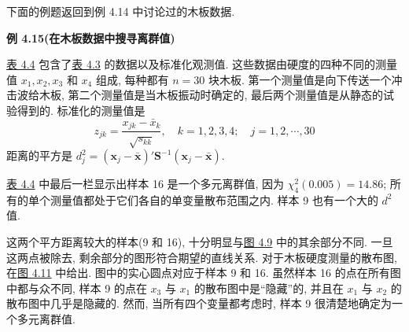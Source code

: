 下面的例题返回到例 4.14 中讨论过的木板数据.

\noindent\textbf{例 4.15}\quad \textbf{(在木板数据中搜寻离群值)}

\hyperref[tab:4.4]{表 4.4} 包含了\hyperref[tab:4.3]{表 4.3} 的数据以及标准化观测值. 这些数据由硬度的四种不同的测量值 $x_{1},x_{2},x_{3}$ 和 $x_{4}$ 组成, 每种都有 $n=30$ 块木板. 第一个测量值是向下传送一个冲击波给木板, 第二个测量值是当木板振动时确定的, 最后两个测量值是从静态的试验得到的. 标准化的测量值是
\[
z_{jk}=\frac{x_{jk}-\bar{x}_{k}}{\sqrt{s_{kk}}},\quad k=1,2,3,4;\quad j=1,2,\cdots,30
\]
距离的平方是 $d_{j}^{2}=(\mathbf{x}_{j}-\bar{\mathbf{x}})'\mathbf{S}^{-1}(\mathbf{x}_{j}-\bar{\mathbf{x}})$.

\hyperref[tab:4.4]{表 4.4} 中最后一栏显示出样本 16 是一个多元离群值, 因为 $\chi_{4}^{2}(0.005)=14.86$; 所有的单个测量值都处于它们各自的单变量散布范围之内. 样本 9 也有一个大的 $d^{2}$ 值.

这两个平方距离较大的样本(9 和 16), 十分明显与\hyperref[fig:4.9]{图 4.9} 中的其余部分不同. 一旦这两点被除去, 剩余部分的图形符合期望的直线关系. 对于木板硬度测量的散布图, 在\hyperref[fig:4.11]{图 4.11} 中给出. 图中的实心圆点对应于样本 9 和 16. 虽然样本 16 的点在所有图中都与众不同, 样本 9 的点在 $x_{3}$ 与 $x_{1}$ 的散布图中是“隐藏”的, 并且在 $x_{1}$ 与 $x_{2}$ 的散布图中几乎是隐藏的. 然而, 当所有四个变量都考虑时, 样本 9 很清楚地确定为一个多元离群值.
